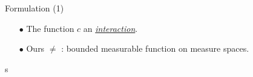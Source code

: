 \documentclass{beamer}
\begin{document}
\begin{frame}{Formulation (1)}
\begin{definition}
\begin{itemize}
      \item[$\bullet$] The function $c$ an \textit{\underline{interaction}}.
    \end{itemize}
  \end{definition}
  \begin{itemize}
    \setlength\itemindent{5pt}
    \item[$\bullet$] Ours $\neq$ \parencite{Chowdhury21b}: bounded measurable function on measure spaces.
  \end{itemize}
s


\end{frame}
\end{document}
